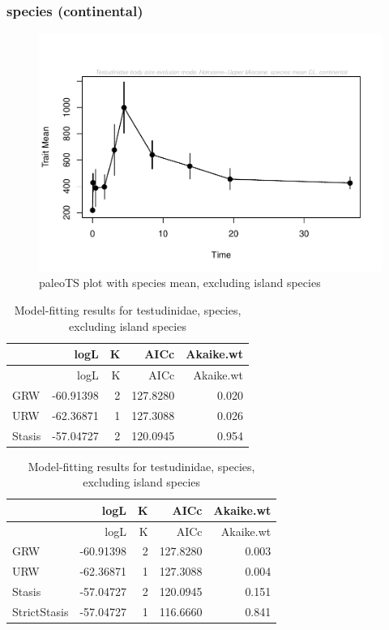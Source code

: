 \documentclass[]{article}
\begin{document}
\newpage

\subsubsection{species (continental)}\label{species-continental}

\begin{figure}[htbp]
\centering
\includegraphics{MA_JJ_files/figure-latex/paleoTS plot with species mean, excluding island species-1.pdf}
\caption{paleoTS plot with species mean, excluding island species}
\end{figure}

\begin{longtable}[]{@{}lrrrr@{}}
\caption{Model-fitting results for testudinidae, species, excluding
island species}\tabularnewline
\toprule
& logL & K & AICc & Akaike.wt\tabularnewline
\midrule
\endfirsthead
\toprule
& logL & K & AICc & Akaike.wt\tabularnewline
\midrule
\endhead
GRW & -60.91398 & 2 & 127.8280 & 0.020\tabularnewline
URW & -62.36871 & 1 & 127.3088 & 0.026\tabularnewline
Stasis & -57.04727 & 2 & 120.0945 & 0.954\tabularnewline
\bottomrule
\end{longtable}

\begin{longtable}[]{@{}lrrrr@{}}
\caption{Model-fitting results for testudinidae, species, excluding
island species}\tabularnewline
\toprule
& logL & K & AICc & Akaike.wt\tabularnewline
\midrule
\endfirsthead
\toprule
& logL & K & AICc & Akaike.wt\tabularnewline
\midrule
\endhead
GRW & -60.91398 & 2 & 127.8280 & 0.003\tabularnewline
URW & -62.36871 & 1 & 127.3088 & 0.004\tabularnewline
Stasis & -57.04727 & 2 & 120.0945 & 0.151\tabularnewline
StrictStasis & -57.04727 & 1 & 116.6660 & 0.841\tabularnewline
\bottomrule
\end{longtable}
\end{document}
